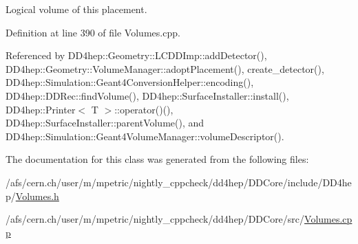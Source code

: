 Logical volume of this placement. 



Definition at line 390 of file Volumes.\+cpp.



Referenced by D\+D4hep\+::\+Geometry\+::\+L\+C\+D\+D\+Imp\+::add\+Detector(), D\+D4hep\+::\+Geometry\+::\+Volume\+Manager\+::adopt\+Placement(), create\+\_\+detector(), D\+D4hep\+::\+Simulation\+::\+Geant4\+Conversion\+Helper\+::encoding(), D\+D4hep\+::\+D\+D\+Rec\+::find\+Volume(), D\+D4hep\+::\+Surface\+Installer\+::install(), D\+D4hep\+::\+Printer$<$ T $>$\+::operator()(), D\+D4hep\+::\+Surface\+Installer\+::parent\+Volume(), and D\+D4hep\+::\+Simulation\+::\+Geant4\+Volume\+Manager\+::volume\+Descriptor().



The documentation for this class was generated from the following files\+:\begin{DoxyCompactItemize}
\item 
/afs/cern.\+ch/user/m/mpetric/nightly\+\_\+cppcheck/dd4hep/\+D\+D\+Core/include/\+D\+D4hep/\hyperlink{_volumes_8h}{Volumes.\+h}\item 
/afs/cern.\+ch/user/m/mpetric/nightly\+\_\+cppcheck/dd4hep/\+D\+D\+Core/src/\hyperlink{_volumes_8cpp}{Volumes.\+cpp}\end{DoxyCompactItemize}
